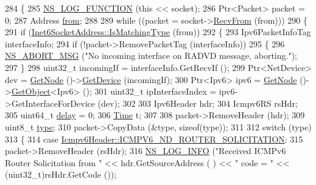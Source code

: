 \begin{DoxyCode}
284 \{
285   \hyperlink{log-macros-disabled_8h_a90b90d5bad1f39cb1b64923ea94c0761}{NS\_LOG\_FUNCTION} (\textcolor{keyword}{this} << socket);
286   Ptr<Packet> packet = 0;
287   Address \hyperlink{lte__amc_8m_a1b4c81ff74eb1a626b5ade44c81004b3}{from};
288 
289   \textcolor{keywordflow}{while} ((packet = socket->\hyperlink{classns3_1_1Socket_af22378d7af9a2745a9eada20210da215}{RecvFrom} (from)))
290     \{
291       \textcolor{keywordflow}{if} (\hyperlink{classns3_1_1Inet6SocketAddress_a4d928c54affbfb530a12076d6d7e0540}{Inet6SocketAddress::IsMatchingType} (from))
292         \{
293           Ipv6PacketInfoTag interfaceInfo;
294           \textcolor{keywordflow}{if} (!packet->RemovePacketTag (interfaceInfo))
295             \{
296               \hyperlink{group__fatal_ga51ac4699be799d772ae7258d1ef6af21}{NS\_ABORT\_MSG} (\textcolor{stringliteral}{"No incoming interface on RADVD message, aborting."});
297             \}
298           uint32\_t incomingIf = interfaceInfo.GetRecvIf ();
299           Ptr<NetDevice> dev = \hyperlink{classns3_1_1Application_a664b15088389bec8e35b35742138f097}{GetNode} ()->\hyperlink{classns3_1_1Node_a5918dfd24ef632efc9a83a5f6561c76e}{GetDevice} (incomingIf);
300           Ptr<Ipv6> ipv6 = \hyperlink{classns3_1_1Application_a664b15088389bec8e35b35742138f097}{GetNode} ()->\hyperlink{classns3_1_1Object_a13e18c00017096c8381eb651d5bd0783}{GetObject}<Ipv6> ();
301           uint32\_t ipInterfaceIndex = ipv6->GetInterfaceForDevice (dev);
302 
303           Ipv6Header hdr;
304           Icmpv6RS rsHdr;
305           uint64\_t \hyperlink{lte_2model_2fading-traces_2fading__trace__generator_8m_a7964e6aa8f61a9d28973c8267a606ad8}{delay} = 0;
306           \hyperlink{namespacens3_1_1TracedValueCallback_a7ffd3e7c142ffe7c8a1d2db9b8de38ec}{Time} t;
307 
308           packet->RemoveHeader (hdr);
309           uint8\_t \hyperlink{visualizer-ideas_8txt_add98db9e15e2a58cf2b57623e7aa893a}{type};
310           packet->CopyData (&type, \textcolor{keyword}{sizeof}(type));
311 
312           \textcolor{keywordflow}{switch} (type)
313             \{
314             \textcolor{keywordflow}{case} \hyperlink{classns3_1_1Icmpv6Header_ad13fcbee075bf00f66ffbc57dfbecb70a8620b40d78b2bf3cc1fe4b3a555de671}{Icmpv6Header::ICMPV6\_ND\_ROUTER\_SOLICITATION}:
315               packet->RemoveHeader (rsHdr);
316               \hyperlink{group__logging_gafbd73ee2cf9f26b319f49086d8e860fb}{NS\_LOG\_INFO} (\textcolor{stringliteral}{"Received ICMPv6 Router Solicitation from "} << hdr.GetSourceAddress (
      ) << \textcolor{stringliteral}{" code = "} << (uint32\_t)rsHdr.GetCode ());

\end{DoxyCode}
